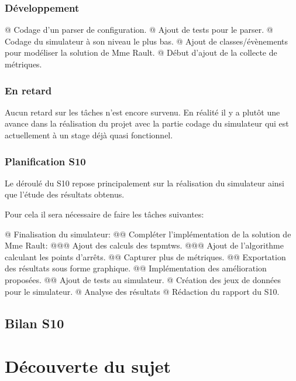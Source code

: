 \documentclass[final]{polytech/polytech}
\begin{document}
			\subsection{Développement}
				\begin{easylist}[itemize]
					@ Codage d'un parser de configuration.
					@ Ajout de tests pour le parser.
					@ Codage du simulateur à son niveau le plus bas.
					@ Ajout de classes/évènements pour modéliser la solution de Mme Rault.
					@ Début d'ajout de la collecte de métriques.
				\end{easylist}

		\subsection{En retard}
			Aucun retard sur les tâches n'est encore survenu.
			En réalité il y a plutôt une avance dans la réalisation du projet avec la partie codage du simulateur qui est actuellement à un stage déjà quasi fonctionnel.
			
		\subsection{Planification S10}
			Le déroulé du S10 repose principalement sur la réalisation du simulateur ainsi que l'étude des résultats obtenus.
			
			Pour cela il sera nécessaire de faire les tâches suivantes:
			\begin{easylist}[itemize]
				@ Finalisation du simulateur:
				@@ Compléter l'implémentation de la solution de Mme Rault:
				@@@ Ajout des calculs des \glspl{tspmtw}.
				@@@ Ajout de l'algorithme calculant les points d'arrêts.
				@@ Capturer plus de métriques.
				@@ Exportation des résultats sous forme graphique.
				@@ Implémentation des amélioration proposées.
				@@ Ajout de tests au simulateur.
				@ Création des jeux de données pour le simulateur.
				@ Analyse des résultats
				@ Rédaction du rapport du S10.
			\end{easylist}

		
	\section{Bilan S10}
	
\appendix
\chapter{Découverte du sujet}
	
\end{document}
